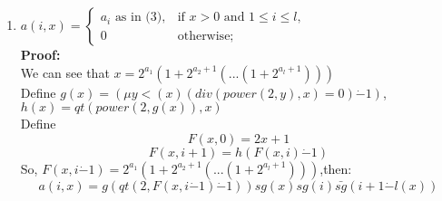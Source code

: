 \documentclass[12pt,a4paper]{article}
\theoremstyle{definition}
\numberwithin{equation}{section}
\numberwithin{figure}{section}
\begin{document}
\begin{enumerate}
\begin{enumerate}
    \item $a(i,x)=\left\{\begin{array}{ll}
        a_{i} \mbox{ as in (3)}, &\mbox{if } x>0 \mbox{ and } 1\leq i \leq l,\\
        0& \mbox{otherwise};
        \end{array}\right.$\\
    \textbf{Proof:}\\
    We can see that $x=2^{a_1}(1+2^{a_2+1}(...(1+2^{a_l+1})))$\\
    Define $g(x)=(\mu y<(x)(div(power(2,y),x)=0) \dot{-} 1)$, $h(x)=qt(power(2,g(x)),x)$\\
    Define $$F(x,0)=2x+1$$
    $$F(x,i+1)=h(F(x,i) \dot{-} 1)$$
    So, $F(x,i\dot{-} 1)=2^{a_1}(1+2^{a_2+1}(...(1+2^{a_l+1})))$,then:
    $$a(i,x)=g(qt(2,F(x,i \dot{-} 1) \dot{-} 1))sg(x)sg(i)\bar{sg}(i+1 \dot{-} l(x))$$
    
    \end{enumerate}

\end{enumerate}


\end{document}
